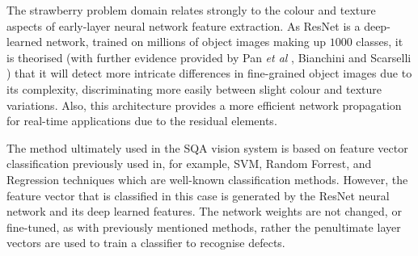 \documentclass[fleqn,twoside,12pt]{report}
\begin{document}
The strawberry problem domain relates strongly to the colour and texture aspects of early-layer neural network feature extraction. As ResNet is a deep-learned network, trained on millions of object images making up $1000$ classes, it is theorised (with further evidence provided by Pan {\it et al} \cite{pan}, Bianchini and Scarselli \cite{bianchini}) that it will detect more intricate differences in fine-grained object images due to its complexity, discriminating more easily between slight colour and texture variations. Also, this architecture provides a more efficient network propagation for real-time applications due to the residual elements.

The method ultimately used in the SQA vision system is based on feature vector classification previously used in, for example, SVM, Random Forrest, and Regression techniques which are well-known classification methods. However, the feature vector that is classified in this case is generated by the ResNet neural network and its deep learned features. The network weights are not changed, or fine-tuned, as with previously mentioned methods, rather the penultimate layer vectors are used to train a classifier to recognise defects. 
\end{document}
